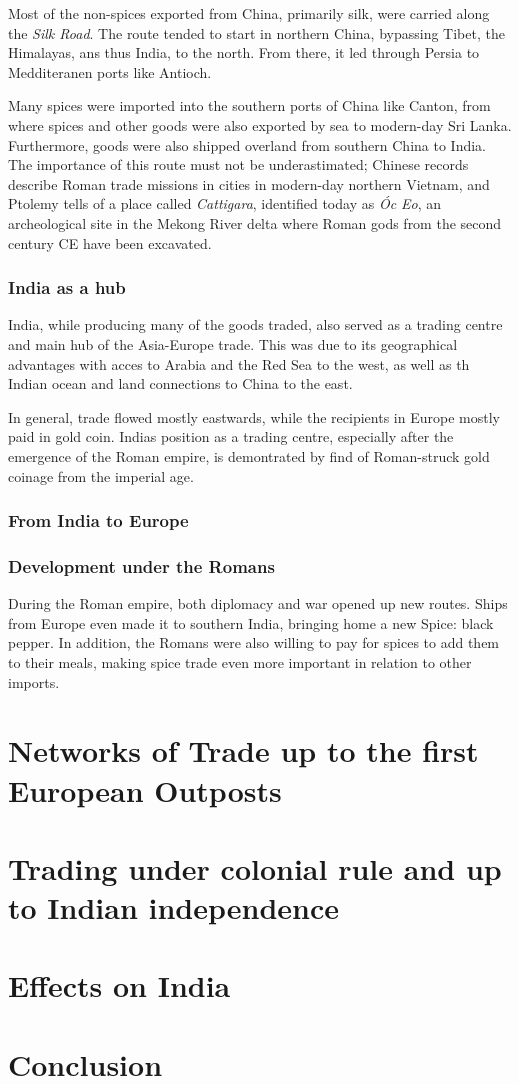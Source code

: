 \documentclass[11pt, a4paper]{scrreprt}
\begin{document}
Most of the non-spices exported from China, primarily silk, were carried along the \emph{Silk Road}. The route tended to start in northern China, bypassing Tibet, the Himalayas, ans thus India, to the north. From there, it led through Persia to Medditeranen ports like Antioch.\autocite[Chapter 7, Maps 2 and 3]{Rome}

Many spices were imported into the southern ports of China like Canton, from where spices and other goods were also exported by sea to modern-day Sri Lanka. Furthermore, goods were also shipped overland from southern China to India.\autocite[Maps 4 and 5]{Rome} The importance of this route must not be underastimated; Chinese records describe Roman trade missions in cities in modern-day northern Vietnam, and Ptolemy tells of a place called \emph{Cattigara}, identified today as \emph{\'{O}c Eo}, an archeological site in the Mekong River delta where Roman gods from the second century CE have been excavated.\autocite{wiki:Óc_Eo}

\subsection{India as a hub}
India, while producing many of the goods traded, also served as a trading centre and main hub of the Asia-Europe trade. This was due to its geographical advantages with acces to Arabia and the Red Sea to the west, as well as th Indian ocean and land connections to China to the east.

In general, trade flowed mostly eastwards, while the recipients in Europe mostly paid in gold coin. Indias position as a trading centre, especially after the emergence of the Roman empire, is demontrated by find of Roman-struck gold coinage from the imperial age.

\subsection{From India to Europe}


\subsection{Development under the Romans}

During the Roman empire, both diplomacy and war opened up new routes. Ships from Europe even made it to southern India, bringing home a new Spice: black pepper. In addition, the Romans were also willing to pay for spices to add them to their meals, making spice trade even more important in relation to other imports.
\chapter{Networks of Trade up to the first European Outposts}
\chapter{Trading under colonial rule and up to Indian independence}
\chapter{Effects on India}
\chapter{Conclusion}
\appendix
\printbibliography
\end{document}
